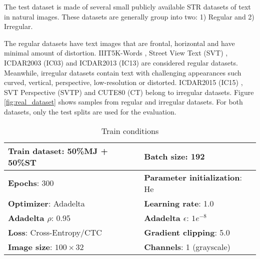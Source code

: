 \documentclass[runningheads]{llncs}
\begin{document}
The test dataset is made of several small publicly available STR datasets of text in natural images. These datasets are generally group into two: 1) Regular and 2) Irregular. 

The regular datasets have text images that are frontal, horizontal and have minimal amount of distortion. IIIT5K-Words \cite{mishra2012scene}, Street View Text (SVT) \cite{wang2011end}, ICDAR2003 (IC03) \cite{lucas2005icdar} and ICDAR2013 (IC13) \cite{karatzas2013icdar} are considered regular datasets. Meanwhile, irregular datasets contain text with challenging appearances such curved, vertical, perspective, low-resolution or distorted. ICDAR2015 (IC15) \cite{karatzas2015icdar}, SVT Perspective (SVTP) \cite{phan2013recognizing} and CUTE80 (CT) \cite{risnumawan2014robust} belong to irregular datasets. Figure \ref{fig:real_dataset} shows samples from regular and irregular datasets. For both datasets, only the test splits are used for the evaluation.

\begin{table}[]
    \centering
    \caption{Train conditions}
    \begin{tabular}{|l|l|}
    \hline
        \textbf{Train dataset}: 50\%MJ + 50\%ST & \textbf{Batch size}: 192\\
    \hline
        \textbf{Epochs}: 300 & \textbf{Parameter initialization}:  He \cite{he2015delving} \\
    \hline
         \textbf{Optimizer}: Adadelta \cite{zeiler2012adadelta} & \textbf{Learning rate}: 1.0\\
    \hline
         \textbf{Adadelta $\rho$}: 0.95 & \textbf{Adadelta $\epsilon$}: $1e^{-8}$\\
    \hline
        \textbf{Loss}: Cross-Entropy/CTC & \textbf{Gradient clipping}: 5.0 \\
    \hline
        \textbf{Image size}: $100\times{32}$ & \textbf{Channels}: 1 (grayscale) \\
    \hline
    \end{tabular}
    \label{tab:train_condition}
\end{table}
\end{document}
